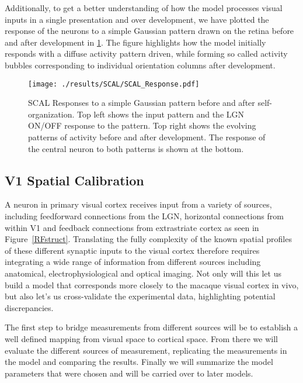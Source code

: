 Additionally, to get a better understanding of how the model processes
visual inputs in a single presentation and over development, we have
plotted the response of the neurons to a simple Gaussian pattern drawn
on the retina before and after development in \ref{SCALResponse}. The
figure highlights how the model initially responds with a diffuse
activity pattern driven, while forming so called activity bubbles
corresponding to individual orientation columns after development.

\begin{figure}
	\centering
    \texttt{[image: ./results/SCAL/SCAL\_Response.pdf]}
	\caption[SCAL Responses to a simple Gaussian pattern before and
      after self-organization.]{SCAL Responses to a simple Gaussian
      pattern before and after self-organization. Top left shows the
      input pattern and the LGN ON/OFF response to the pattern. Top
      right shows the evolving patterns of activity before and after
      development. The response of the central neuron to both patterns
      is shown at the bottom.}
	\label{SCALResponse}
\end{figure}

\subsection{V1 Spatial Calibration}

A neuron in primary visual cortex receives input from a variety of
sources, including feedforward connections from the LGN, horizontal
connections from within V1 and feedback connections from extrastriate
cortex as seen in Figure~\ref{RFstruct}. Translating the fully
complexity of the known spatial profiles of these different synaptic
inputs to the visual cortex therefore requires integrating a wide
range of information from different sources including anatomical,
electrophysiological and optical imaging. Not only will this let us
build a model that corresponds more closely to the macaque visual
cortex in vivo, but also let's us cross-validate the experimental
data, highlighting potential discrepancies.

The first step to bridge measurements from different sources will be
to establish a well defined mapping from visual space to cortical
space. From there we will evaluate the different sources of
measurement, replicating the measurements in the model and comparing
the results. Finally we will summarize the model parameters that were
chosen and will be carried over to later models.


